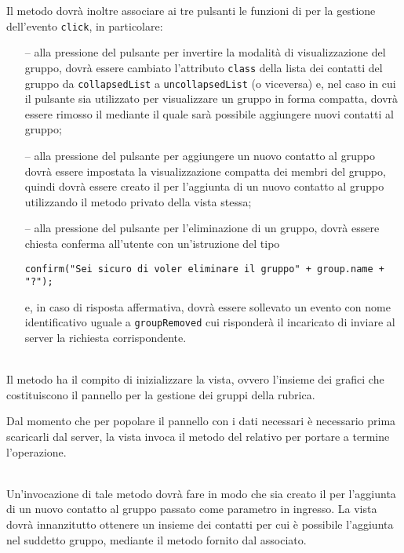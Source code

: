 \begin{description}
  Il metodo dovrà inoltre associare ai tre pulsanti le funzioni di  per la gestione dell'evento \verb'click', in particolare:
  \begin{itemize}
    \item[--] alla pressione del pulsante per invertire la modalità di visualizzazione del gruppo, dovrà essere cambiato l'attributo \verb'class' della lista dei contatti del gruppo da \verb'collapsedList' a \verb'uncollapsedList' (o viceversa) e, nel caso in cui il pulsante sia utilizzato per visualizzare un gruppo in forma compatta, dovrà essere rimosso il  mediante il quale sarà possibile aggiungere nuovi contatti al gruppo;
    \item[--] alla pressione del pulsante per aggiungere un nuovo contatto al gruppo dovrà essere impostata la visualizzazione compatta dei membri del gruppo, quindi dovrà essere creato il  per l'aggiunta di un nuovo contatto al gruppo utilizzando il metodo privato  della vista stessa;
    \item[--] alla pressione del pulsante per l'eliminazione di un gruppo, dovrà essere chiesta conferma all'utente con un'istruzione del tipo
    \begin{verbatim}
confirm("Sei sicuro di voler eliminare il gruppo" + group.name + "?");
    \end{verbatim}
    e, in caso di risposta affermativa, dovrà essere sollevato un evento con nome identificativo uguale a \verb'groupRemoved' cui risponderà il  incaricato di inviare al server la richiesta corrispondente.
  \end{itemize}
  
  \item{}\\
  Il metodo ha il compito di inizializzare la vista, ovvero l'insieme dei  grafici che costituiscono il pannello per la gestione dei gruppi della rubrica.
  
  Dal momento che per popolare il pannello con i dati necessari è necessario prima scaricarli dal server, la vista invoca il metodo  del relativo  per portare a termine l'operazione.
  
  \item{}\\
  Un'invocazione di tale metodo dovrà fare in modo che sia creato il  per l'aggiunta di un nuovo contatto al gruppo passato come parametro in ingresso. La vista dovrà innanzitutto ottenere un insieme dei contatti per cui è possibile l'aggiunta nel suddetto gruppo, mediante il metodo  fornito dal  associato.
  

\end{description}
